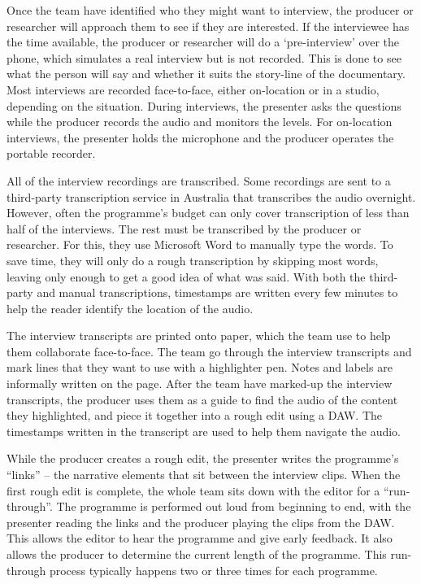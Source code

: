 Once the team have identified who they might want to interview, the producer or researcher will approach them to see if
they are interested.  If the interviewee has the time available, the producer or researcher will do a `pre-interview'
over the phone, which simulates a real interview but is not recorded. This is done to see what the person will say and
whether it suits the story-line of the documentary.  Most interviews are recorded face-to-face, either on-location or in
a studio, depending on the situation.  During interviews, the presenter asks the questions while the producer records
the audio and monitors the levels.  For on-location interviews, the presenter holds the microphone and the producer
operates the portable recorder.

All of the interview recordings are transcribed. Some recordings are sent to a third-party transcription service in
Australia that transcribes the audio overnight.  However, often the programme's budget can only cover transcription of
less than half of the interviews. The rest must be transcribed by the producer or researcher. For this, they use
Microsoft Word to manually type the words.  To save time, they will only do a rough transcription by skipping most
words, leaving only enough to get a good idea of what was said.  With both the third-party and manual transcriptions,
timestamps are written every few minutes to help the reader identify the location of the audio.

The interview transcripts are printed onto paper, which the team use to help them collaborate face-to-face.  The team
go through the interview transcripts and mark lines that they want to use with a highlighter pen. Notes and labels are
informally written on the page.  After the team have marked-up the interview transcripts, the producer uses them as a
guide to find the audio of the content they highlighted, and piece it together into a rough edit using a DAW. The
timestamps written in the transcript are used to help them navigate the audio.

While the producer creates a rough edit, the presenter writes the programme's ``links'' -- the narrative elements that
sit between the interview clips. When the first rough edit is complete, the whole team sits down with the editor for a
``run-through''. The programme is performed out loud from beginning to end, with the presenter reading the links and
the producer playing the clips from the DAW. This allows the editor to hear the programme and give early feedback. It
also allows the producer to determine the current length of the programme.  This run-through process typically happens
two or three times for each programme.

